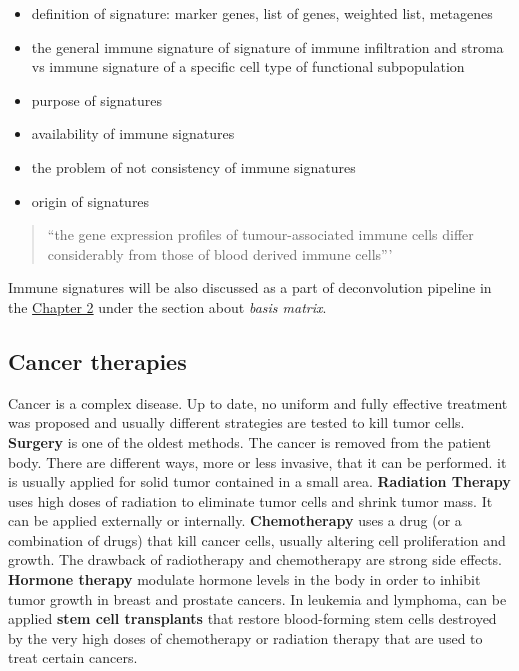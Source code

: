 \documentclass[12pt,]{book}
\providecommand{\tightlist}{%
  \setlength{\itemsep}{0pt}\setlength{\parskip}{0pt}}
\theoremstyle{definition}
\theoremstyle{definition}
\theoremstyle{definition}
\theoremstyle{remark}
\begin{document}
\begin{itemize}
\tightlist
\item
  definition of signature: marker genes, list of genes, weighted list,
  metagenes
\item
  the general immune signature of signature of immune infiltration and
  stroma vs immune signature of a specific cell type of functional
  subpopulation
\item
  purpose of signatures
\item
  availability of immune signatures
\item
  the problem of not consistency of immune signatures
\item
  origin of signatures
\end{itemize}

\begin{quote}
``the gene expression profiles of tumour-associated immune cells differ
considerably from those of blood derived immune cells'''
\citep{Schelker2017}
\end{quote}

Immune signatures will be also discussed as a part of deconvolution
pipeline in the \protect\hyperlink{methods}{Chapter 2} under the section
about \emph{basis matrix}.

\hypertarget{cancer_Therapies}{%
\subsection{Cancer therapies}\label{cancer_Therapies}}

Cancer is a complex disease. Up to date, no uniform and fully effective
treatment was proposed and usually different strategies are tested to
kill tumor cells. \textbf{Surgery} is one of the oldest methods. The
cancer is removed from the patient body. There are different ways, more
or less invasive, that it can be performed. it is usually applied for
solid tumor contained in a small area. \textbf{Radiation Therapy} uses
high doses of radiation to eliminate tumor cells and shrink tumor mass.
It can be applied externally or internally. \textbf{Chemotherapy} uses a
drug (or a combination of drugs) that kill cancer cells, usually
altering cell proliferation and growth. The drawback of radiotherapy and
chemotherapy are strong side effects. \textbf{Hormone therapy } modulate
hormone levels in the body in order to inhibit tumor growth in breast
and prostate cancers. In leukemia and lymphoma, can be applied
\textbf{stem cell transplants} that restore blood-forming stem cells
destroyed by the very high doses of chemotherapy or radiation therapy
that are used to treat certain cancers.
\end{document}
